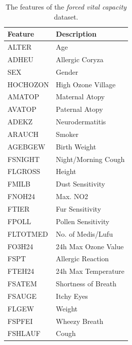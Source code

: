 \documentclass[twoside,twocolumn,10pt]{revtex4-1}
\begin{document}
	\begin{table}[H]
	\center
		\begin{tabular}{l l}
		\textbf{Feature} & \textbf{Description} \\ 
		\hline	
		ALTER & Age\\
		ADHEU & Allergic Coryza\\
		SEX & Gender\\
		HOCHOZON & High Ozone Village\\
		AMATOP & Maternal Atopy\\
		AVATOP & Paternal Atopy\\
		ADEKZ & Neurodermatitis\\
		ARAUCH & Smoker\\
		AGEBGEW & Birth Weight\\
		FSNIGHT & Night/Morning Cough\\
		FLGROSS & Height\\
		FMILB & Dust Sensitivity\\
		FNOH24 & Max. NO2\\
		FTIER & Fur Sensitivity\\
		FPOLL & Pollen Sensitivity\\
		FLTOTMED & No. of Medis/Lufu\\
		FO3H24 & 24h Max Ozone Value\\
		FSPT & Allergic Reaction\\
		FTEH24 & 24h Max Temperature\\
		FSATEM & Shortness of Breath\\
		FSAUGE & Itchy Eyes\\
		FLGEW & Weight\\
		FSPFEI & Wheezy Breath\\
		FSHLAUF & Cough
		\end{tabular}
		\caption{The features of the \textit{forced vital capacity} dataset.\label{table_0}}
	\end{table}
	
\end{document}
